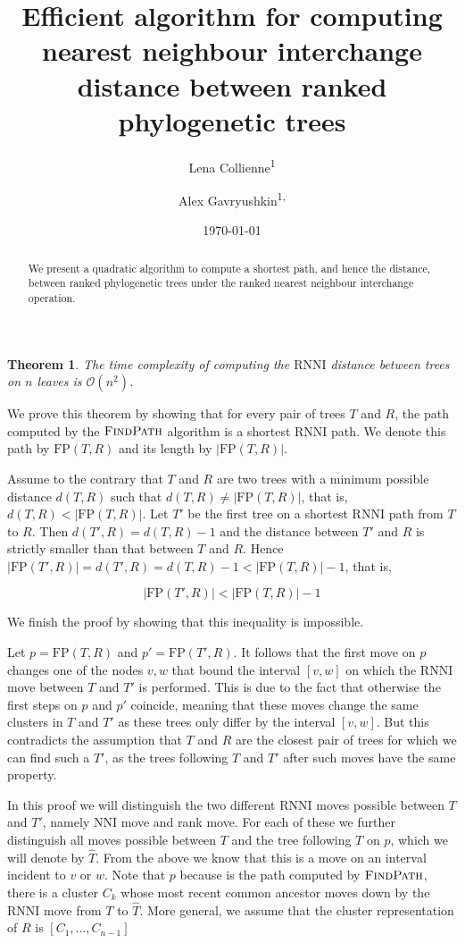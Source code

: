 \documentclass{amsart}
\title[Computing $\rnni$ distance]{Efficient algorithm for computing nearest neighbour interchange distance between ranked phylogenetic trees}
\date{\today}
\author{Lena Collienne\textsuperscript{1}}
\author{Alex Gavryushkin\textsuperscript{1, \Letter}}
\newtheorem{theorem}{Theorem}
\newcommand{\rnni}{\mathrm{RNNI}}
\newcommand{\findpath}{\textsc{FindPath}}
\newcommand{\nni}{\mathrm{NNI}}
\newcommand{\fp}{\mathrm{FP}}
\renewcommand{\O}{\mathcal O}
\begin{document}
\begin{abstract}
We present a quadratic algorithm to compute a shortest path, and hence the distance, between ranked phylogenetic trees under the ranked nearest neighbour interchange operation.
\end{abstract}


\maketitle

\begin{theorem}
The time complexity of computing the $\rnni$ distance between trees on $n$ leaves is $\O(n^2)$.
\end{theorem}

\proof
We prove this theorem by showing that for every pair of trees $T$ and $R$, the path computed by the $\findpath$ algorithm is a shortest $\rnni$ path.
We denote this path by $\fp(T, R)$ and its length by $|\fp(T, R)|$.

Assume to the contrary that $T$ and $R$ are two trees with a minimum possible distance $d(T, R)$ such that $d(T,R) \neq |\fp(T,R)|$, that is, $d(T,R) < |\fp(T,R)|$.
Let $T'$ be the first tree on a shortest $\rnni$ path from $T$ to $R$.
Then $d(T',R) = d(T, R) - 1$ and the distance between $T'$ and $R$ is strictly smaller than that between $T$ and $R$.
Hence $|\fp(T',R)| = d(T', R) = d(T, R) - 1 < |\fp(T,R)| - 1$, that is,

\[
|\fp(T',R)| < |\fp(T,R)| - 1
\]

We finish the proof by showing that this inequality is impossible.

Let $p = \fp(T,R)$ and $p' = \fp(T', R)$.
It follows that the first move on $p$ changes one of the nodes $v, w$ that bound the interval $[v,w]$ on which the $\rnni$ move between $T$ and $T'$ is performed.
This is due to the fact that otherwise the first steps on $p$ and $p'$ coincide, meaning that these moves change the same clusters in $T$ and $T'$ as these trees only differ by the interval $[v,w]$.
But this contradicts the assumption that $T$ and $R$ are the closest pair of trees for which we can find such a $T'$, as the trees following $T$ and $T'$ after such moves have the same property.

In this proof we will distinguish the two different $\rnni$ moves possible between $T$ and $T'$, namely $\nni$ move and rank move.
For each of these we further distinguish all moves possible between $T$ and the tree following $T$ on $p$, which we will denote by $\hat T$.
From the above we know that this is a move on an interval incident to $v$ or $w$.
Note that $p$ because is the path computed by $\findpath$, there is a cluster $C_k$ whose most recent common ancestor moves down by the $\rnni$ move from $T$ to $\hat T$.
More general, we assume that the cluster representation of $R$ is $[C_1, \ldots, C_{n-1}]$
\end{document}
